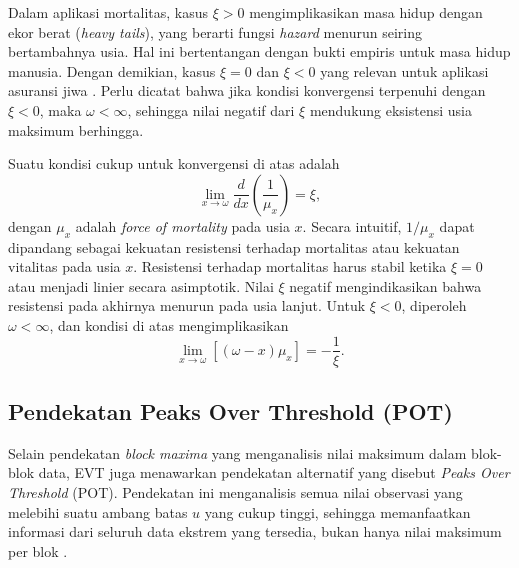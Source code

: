 Dalam aplikasi mortalitas, kasus $\xi > 0$ mengimplikasikan masa hidup dengan ekor berat (\textit{heavy tails}), yang berarti fungsi \textit{hazard} menurun seiring bertambahnya usia. Hal ini bertentangan dengan bukti empiris untuk masa hidup manusia. Dengan demikian, kasus $\xi = 0$ dan $\xi < 0$ yang relevan untuk aplikasi asuransi jiwa \citep{gbari2017extreme}. Perlu dicatat bahwa jika kondisi konvergensi terpenuhi dengan $\xi < 0$, maka $\omega < \infty$, sehingga nilai negatif dari $\xi$ mendukung eksistensi usia maksimum berhingga.

Suatu kondisi cukup untuk konvergensi di atas adalah
\begin{equation}
    \lim_{x \to \omega} \frac{d}{dx}\left(\frac{1}{\mu_x}\right) = \xi,
\end{equation}
dengan $\mu_x$ adalah \textit{force of mortality} pada usia $x$. Secara intuitif, $1/\mu_x$ dapat dipandang sebagai kekuatan resistensi terhadap mortalitas atau kekuatan vitalitas pada usia $x$. Resistensi terhadap mortalitas harus stabil ketika $\xi = 0$ atau menjadi linier secara asimptotik. Nilai $\xi$ negatif mengindikasikan bahwa resistensi pada akhirnya menurun pada usia lanjut. Untuk $\xi < 0$, diperoleh $\omega < \infty$, dan kondisi di atas mengimplikasikan
\begin{equation}
    \lim_{x \to \omega} \left[(\omega - x) \mu_x\right] = -\frac{1}{\xi}.
\end{equation}

\subsection{Pendekatan Peaks Over Threshold (POT)}

Selain pendekatan \textit{block maxima} yang menganalisis nilai maksimum dalam blok-blok data, EVT juga menawarkan pendekatan alternatif yang disebut \textit{Peaks Over Threshold} (POT). Pendekatan ini menganalisis semua nilai observasi yang melebihi suatu ambang batas $u$ yang cukup tinggi, sehingga memanfaatkan informasi dari seluruh data ekstrem yang tersedia, bukan hanya nilai maksimum per blok \citep{coles2001introduction}.

